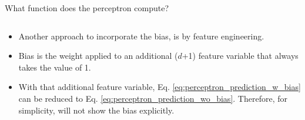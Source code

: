 \begin{frame}[t]{What function does the perceptron compute?}
\begin{columns}
\begin{column}{0.50\textwidth}
\begin{itemize}
                \small
                \item Another approach to incorporate the bias, 
                is by \gls{feature engineering}.
                \item Bias is the weight applied to an additional ($d$+1) 
                feature variable that always takes the value of 1.
                \item With that additional feature variable, 
                Eq. \ref{eq:perceptron_prediction_w_bias}
                can be reduced to Eq. \ref{eq:perceptron_prediction_wo_bias}.
                Therefore, for simplicity, will not show the bias explicitly.
            \end{itemize}        
        \end{column}
      \end{columns}

\end{frame}

%
%
%

